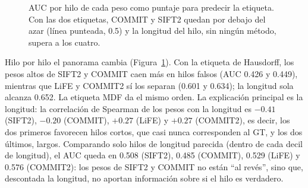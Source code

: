 \documentclass[11pt,a4paper]{article}
\begin{document}
\begin{figure}[H]
\centering
{}
\caption{AUC por hilo de cada peso como puntaje para predecir la etiqueta. Con las dos
etiquetas, COMMIT y SIFT2 quedan por debajo del azar (l\'inea punteada, 0.5) y la longitud
del hilo, sin ning\'un m\'etodo, supera a los cuatro.}
\label{fig:auc}
\end{figure}

Hilo por hilo el panorama cambia (Figura~\ref{fig:auc}). Con la etiqueta de Hausdorff, los
pesos altos de SIFT2 y COMMIT caen m\'as en hilos falsos (AUC 0.426 y 0.449), mientras que
LiFE y COMMIT2 s\'i los separan (0.601 y 0.634); la longitud sola alcanza 0.652. La
etiqueta MDF da el mismo orden. La explicaci\'on principal es la longitud: la correlaci\'on de
Spearman de los pesos con la longitud es $-0.41$ (SIFT2), $-0.20$ (COMMIT), $+0.27$ (LiFE) y
$+0.27$ (COMMIT2), es decir, los dos primeros favorecen hilos cortos, que casi nunca
corresponden al GT, y los dos \'ultimos, largos. Comparando solo hilos de longitud parecida
(dentro de cada decil de longitud), el AUC queda en 0.508 (SIFT2), 0.485 (COMMIT), 0.529
(LiFE) y 0.576 (COMMIT2): los pesos de SIFT2 y COMMIT no est\'an ``al rev\'es'', sino que,
descontada la longitud, no aportan informaci\'on sobre si el hilo es verdadero.
\end{document}
